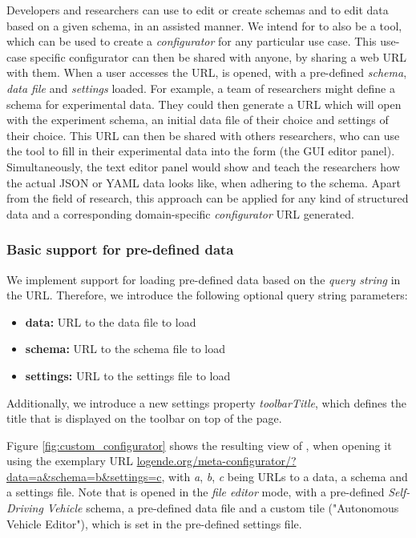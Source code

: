 Developers and researchers can use \toolname{} to edit or create schemas and to edit data based on a given schema, in an assisted manner.
We intend for \toolname{} to also be a tool, which can be used to create a \textit{configurator} for any particular use case.
This use-case specific configurator can then be shared with anyone, by sharing a web URL with them.
When a user accesses the URL, \toolname{} is opened, with a pre-defined \textit{schema}, \textit{data file} and \textit{settings} loaded.
For example, a team of researchers might define a schema for experimental data. 
They could then generate a URL which will open \toolname{} with the experiment schema, an initial data file of their choice and settings of their choice.
This URL can then be shared with others researchers, who can use the tool to fill in their experimental data into the form (the GUI editor panel).
Simultaneously, the text editor panel would show and teach the researchers how the actual JSON or YAML data looks like, when adhering to the schema.
Apart from the field of research, this approach can be applied for any kind of structured data and a corresponding domain-specific \textit{configurator} URL generated.

\subsubsection{Basic support for pre-defined data}\label{subsubsec:custom_configurator_basic}
We implement support for loading pre-defined data based on the \textit{query string} in the URL.
Therefore, we introduce the following optional query string parameters:
\begin{itemize}
	\item \textbf{data:} URL to the data file to load
	\item \textbf{schema:} URL to the schema file to load
	\item \textbf{settings:} URL to the settings file to load
\end{itemize}

Additionally, we introduce a new settings property \textit{toolbarTitle}, which defines the title that is displayed on the \toolname{} toolbar on top of the page.

Figure \ref{fig:custom_configurator} shows the resulting view of \toolname{}, when opening it using the exemplary URL \underline{logende.org/meta-configurator/?data=a\&schema=b\&settings=c}, with \textit{a}, \textit{b}, \textit{c} being URLs to a data, a schema and a settings file.
Note that \toolname{} is opened in the \textit{file editor} mode, with a pre-defined \textit{Self-Driving Vehicle} schema, a pre-defined data file and a custom tile ("Autonomous Vehicle Editor"), which is set in the pre-defined settings file.



